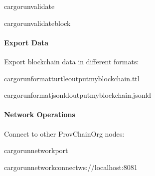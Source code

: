 \documentclass[letterpaper,10pt,english]{sphinxmanual}
\begin{document}
\begin{sphinxVerbatim}[commandchars=\\\{\}]
cargorun\PYGZhy{}\PYGZhy{}validate

cargorun\PYGZhy{}\PYGZhy{}validate\PYGZhy{}\PYGZhy{}block
\end{sphinxVerbatim}


\paragraph{Export Data}
\label{\detokenize{user-guide/first-steps:export-data}}
\sphinxAtStartPar
Export blockchain data in different formats:

\begin{sphinxVerbatim}[commandchars=\\\{\}]
cargorun\PYGZhy{}\PYGZhy{}\PYGZhy{}\PYGZhy{}formatturtle\PYGZhy{}\PYGZhy{}outputmy\PYGZus{}blockchain.ttl

cargorun\PYGZhy{}\PYGZhy{}\PYGZhy{}\PYGZhy{}formatjsonld\PYGZhy{}\PYGZhy{}outputmy\PYGZus{}blockchain.jsonld
\end{sphinxVerbatim}


\paragraph{Network Operations}
\label{\detokenize{user-guide/first-steps:network-operations}}
\sphinxAtStartPar
Connect to other ProvChainOrg nodes:

\begin{sphinxVerbatim}[commandchars=\\\{\}]
cargorun\PYGZhy{}\PYGZhy{}network\PYGZhy{}\PYGZhy{}port

cargorun\PYGZhy{}\PYGZhy{}network\PYGZhy{}\PYGZhy{}connectws://localhost:8081
\end{sphinxVerbatim}
\end{document}
